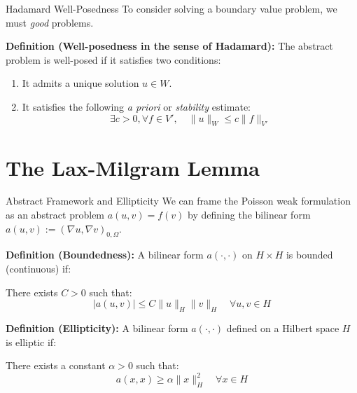 \documentclass[aspectratio=169]{beamer}
\begin{document}
\begin{frame}{Hadamard Well-Posedness}
    To consider solving a boundary value problem, we must \emph{good} problems.

    \vspace{0.3cm}
    \textbf{Definition (Well-posedness in the sense of Hadamard):}
    The abstract problem is well-posed if it satisfies two conditions:
    \begin{enumerate}
        \item It admits a unique solution $u \in W$.
        \item It satisfies the following \textit{a priori} or \emph{stability} estimate:
        $$ \exists c > 0, \forall f \in V', \quad \|u\|_W \le c\|f\|_{V'} $$
    \end{enumerate}

    \vspace{0.3cm}
\end{frame}


\section{The Lax-Milgram Lemma}

\begin{frame}{Abstract Framework and Ellipticity}
    We can frame the Poisson weak formulation as an abstract problem $a(u,v) = f(v)$ by defining the bilinear form $a(u,v) := (\nabla u, \nabla v)_{0,\Omega}$.

    \vspace{0.2cm}
    \textbf{Definition (Boundedness):}
    A bilinear form $a(\cdot, \cdot)$ on $H \times H$ is bounded (continuous) if:

    There exists $C > 0$ such that:
    $$ |a(u, v)| \le C \|u\|_H \|v\|_H \quad \forall u, v \in H $$

    \vspace{0.2cm}
    \textbf{Definition (Ellipticity):}
    A bilinear form $a(\cdot, \cdot)$ defined on a Hilbert space $H$ is elliptic if: 

    There exists a constant $\alpha > 0$ such that:
    $$ a(x, x) \ge \alpha \|x\|^2_H \quad \forall x \in H $$

\end{frame}
\end{document}
